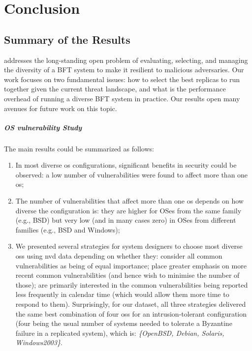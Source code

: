 \chapter{Conclusion}
\label{chap:conclusion}

\section{Summary of the Results}
\system addresses the long-standing open problem of evaluating, selecting, and managing the diversity of a BFT system to make it resilient to malicious adversaries.
Our work focuses on two fundamental issues: how to select the best replicas to run together given the current threat landscape, and what is the performance overhead of running a diverse BFT system in practice.
Our results open many avenues for future work on this topic.

\paragraph{OS vulnerability Study}
The main results could be summarized as follows:
\begin{enumerate}
\item In most diverse \gls{os} configurations, significant  benefits in security could be observed: a low number of vulnerabilities were found to affect more than one \gls{os};

\item The number of vulnerabilities that affect more than one \gls{os} depends on how diverse the configuration is: they are higher for OSes from the same family (e.g., BSD) but very low (and in many cases zero) in OSes from different families (e.g., BSD and Windows);

\item We presented several strategies for system designers to choose most diverse \glspl{os} using \gls{nvd} data depending on whether they: consider all common vulnerabilities as being of equal importance; place greater emphasis on more recent common vulnerabilities (and hence wish to minimise the number of those); are primarily interested in the common vulnerabilities being reported less frequently in calendar time (which would allow them more time to respond to them). Surprisingly, for our dataset, all three strategies delivered the same best combination of four \glspl{os} for an intrusion-tolerant configuration (four being the usual number of systems needed to tolerate a Byzantine failure in a replicated system), which is: \textit{\{OpenBSD, Debian, Solaris, Windows2003\}}.

\end{enumerate}



